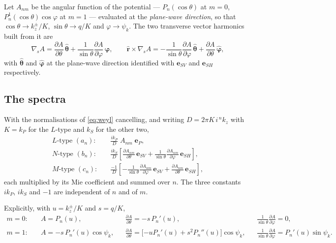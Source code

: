 \documentclass[11pt,a4paper]{article}
\newcommand{\br}{\mathbf{r}}
\newcommand{\bep}{\mathbf{e}}
\newcommand{\rhat}{\hat{\br}}
\begin{document}
Let $A_{nm}$ be the angular function of the potential --- $P_n(\cos\theta)$ at
$m=0$, $P_n^1(\cos\theta)\cos\varphi$ at $m=1$ --- evaluated at the
\emph{plane-wave direction}, so that $\cos\theta \to k_z^{\pm}/K$,
$\sin\theta \to q/K$ and $\varphi \to \psi_k$.  The two transverse vector
harmonics built from it are
\begin{equation}\label{eq:vecharm}
  \nabla_{\!s}A = \frac{\partial A}{\partial\theta}\,\hat{\boldsymbol\theta}
    + \frac{1}{\sin\theta}\frac{\partial A}{\partial\varphi}\,\hat{\boldsymbol\varphi},
  \qquad
  \rhat\times\nabla_{\!s}A
    = -\frac{1}{\sin\theta}\frac{\partial A}{\partial\varphi}\,\hat{\boldsymbol\theta}
      + \frac{\partial A}{\partial\theta}\,\hat{\boldsymbol\varphi},
\end{equation}
with $\hat{\boldsymbol\theta}$ and $\hat{\boldsymbol\varphi}$ at the plane-wave
direction identified with $\bep_{SV}$ and $\bep_{SH}$ respectively.

\subsection{The spectra}

With the normalisations of \eqref{eq:weyl} cancelling, and writing
$D = 2\pi K\,i^{\,n} k_z$ with $K = k_P$ for the $L$-type and $k_S$ for the
other two,
\begin{equation}\label{eq:spectra}
\boxed{\;
\begin{aligned}
  \text{$L$-type } (a_n):\quad
    &\frac{i k_P}{D}\;A_{nm}\;\bep_P,\\[4pt]
  \text{$N$-type } (b_n):\quad
    &\frac{i k_S}{D}\left[\frac{\partial A_{nm}}{\partial\theta}\,\bep_{SV}
      + \frac{1}{\sin\theta}\frac{\partial A_{nm}}{\partial\varphi}\,\bep_{SH}\right],\\[4pt]
  \text{$M$-type } (c_n):\quad
    &\frac{-1}{D}\left[-\frac{1}{\sin\theta}\frac{\partial A_{nm}}{\partial\varphi}\,\bep_{SV}
      + \frac{\partial A_{nm}}{\partial\theta}\,\bep_{SH}\right],
\end{aligned}\;}
\end{equation}
each multiplied by its Mie coefficient and summed over $n$.  The three
constants $ik_P$, $ik_S$ and $-1$ are independent of $n$ and of $m$.

Explicitly, with $u = k_z^{\pm}/K$ and $s = q/K$,
\begin{equation}\label{eq:angexplicit}
\begin{aligned}
  m=0:\quad & A = P_n(u), &
    & \frac{\partial A}{\partial\theta} = -s\,P_n'(u), &
    & \frac{1}{\sin\theta}\frac{\partial A}{\partial\varphi} = 0,\\[4pt]
  m=1:\quad & A = -s\,P_n'(u)\cos\psi_k, &
    & \frac{\partial A}{\partial\theta} = \big[{-u}P_n'(u) + s^2P_n''(u)\big]\cos\psi_k, &
    & \frac{1}{\sin\theta}\frac{\partial A}{\partial\varphi} = P_n'(u)\sin\psi_k .
\end{aligned}
\end{equation}
\end{document}
